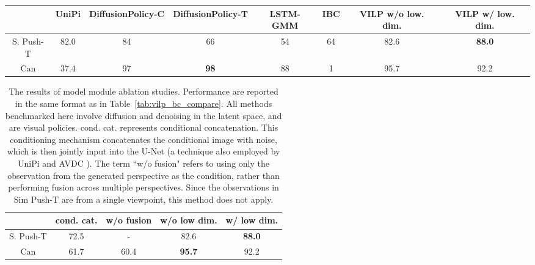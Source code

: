 \documentclass[doublecolumn]{IEEEtran}
\begin{document}
\begin{table*}[t]
\centering
{
\begin{tabular}{|c|c|c|c|c|c|c|c|}
\hline
         &{UniPi} & DiffusionPolicy-C & DiffusionPolicy-T & LSTM-GMM & IBC & VILP w/o low. dim. & VILP w/ low. dim. \\ \hline
S. Push-T & {82.0}& 84                & 66                & 54       & 64  & 82.6               & \textbf{88.0}              \\
Can       & {37.4}& 97                & \textbf{98}                & 88       & 1   & 95.7               & 92.2              \\ \hline
\end{tabular}}
\caption{{{The results of the comparison between Unipi, VILP, and diffusion policy (``C" and ``T" denote backbones based on CNN and transformer) \cite{chi2023diffusionpolicy}, LSTM-GMM \cite{mandlekar2022matters}, and IBC \cite{florence2022implicit}, on the Sim Push-T and Can-PickPlace tasks. Both UniPi and VILP use 16 inference steps.} All policies in this study are visual policies rather than exclusively low-dimensional ones. In addition to image observations, VILP labeled with ``w/ low. dim." also use low-dimensional observations. We present success rates with average of last 10 checkpoints, with each averaged across 3 training seeds and 50 different environment initial conditions (150 in total). We used the same seeds and experimental setup as those in \cite{chi2023diffusionpolicy}; therefore, the baseline results are directly adapted from \cite{chi2023diffusionpolicy}.}}
\label{tab:vilp_bc_compare}
\end{table*}




\begin{table}[t]
\centering
{
\begin{tabular}{|c|c|c|c|c|}
\hline
           & cond. cat. & w/o fusion & w/o low dim. & w/ low dim. \\ \hline
S. Push-T & 72.5                 & -                          & {82.6}             & \textbf{88.0}              \\
Can        & 61.7                 & 60.4                       & \textbf{95.7}             & {92.2}            \\ \hline
\end{tabular}}
\caption{{The results of model module ablation studies. Performance are reported in the same format as in Table~\ref{tab:vilp_bc_compare}. All methods benchmarked here involve diffusion and denoising in the latent space, and are visual policies. cond. cat. represents conditional concatenation. This conditioning mechanism concatenates the conditional image with noise, which is then jointly input into the U-Net (a technique also employed by UniPi \cite{du2024learning} and AVDC \cite{Ko2023Learning}). The term ``w/o fusion" refers to using only the observation from the generated perspective as the condition, rather than performing fusion across multiple perspectives. Since the observations in Sim Push-T are from a single viewpoint, this method does not apply.}}
\label{tab:ablation_vilp}
\end{table}
\end{document}
